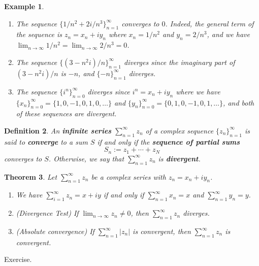 \documentclass[10pt]{article}
\makeatletter
\theoremstyle{newstyle}
\newtheorem{thm}{Theorem}[section]
\newtheorem{defn}[thm]{Definition}
\newtheorem{exmp}[thm]{Example}
\newenvironment{pf}[1][\proofname]{\par
  \pushQED{\qed}%
  \normalfont \topsep0\p@\relax
  \trivlist
  \item[\hskip\labelsep\scshape
  #1\@addpunct{.}]\ignorespaces
}{%
  \popQED\endtrivlist\@endpefalse
}
\makeatother
\begin{document}
\begin{exmp}~
\begin{enumerate}[(1)]
    \item The sequence $\{1/n^2 + 2i/n^3\}_{n=1}^\infty$ converges to $0$. Indeed, the general 
    term of the sequence is $z_n = x_n + iy_n$ where $x_n = 1/n^2$ and $y_n = 2/n^3$, and we have 
    $\lim_{n\to\infty} 1/n^2 = \lim_{n\to\infty} 2/n^3 = 0$. 
    \item The sequence $\{(3-n^2i)/n\}_{n=1}^\infty$ diverges since the imaginary part of 
    $(3-n^2i)/n$ is $-n$, and $\{-n\}_{n=1}^\infty$ diverges. 
    \item The sequence $\{i^n\}_{n=0}^\infty$ diverges since $i^n = x_n + iy_n$ where we have 
    $\{x_n\}_{n=0}^\infty = \{1, 0, -1, 0, 1, 0, \dots\}$ and 
    $\{y_n\}_{n=0}^\infty = \{0, 1, 0, -1, 0, 1, \dots\}$, and both of these sequences are divergent. 
\end{enumerate}
\end{exmp}

\begin{defn}
An {\bf infinite series} $\sum_{n=1}^\infty z_n$ of a complex sequence $\{z_n\}_{n=1}^\infty$ 
is said to {\bf converge} to a sum $S$ if and only if the {\bf sequence of partial sums} 
\[ S_n := z_1 + \cdots + z_N \] 
converges to $S$. Otherwise, we say that $\sum_{n=1}^\infty z_n$ is {\bf divergent}. 
\end{defn}

\begin{thm}
Let $\sum_{n=1}^\infty z_n$ be a complex series with $z_n = x_n + iy_n$. 
\begin{enumerate}[(1)]
    \item We have $\sum_{i=1}^\infty z_n = x + iy$ if and only if $\sum_{n=1}^\infty x_n = x$ and 
    $\sum_{n=1}^\infty y_n = y$. 
    \item (Divergence Test) If $\lim_{n\to\infty} z_n \neq 0$, then $\sum_{n=1}^\infty z_n$ diverges. 
    \item (Absolute convergence) If $\sum_{n=1}^\infty |z_n|$ is convergent, then 
    $\sum_{n=1}^\infty z_n$ is convergent. 
\end{enumerate}
\end{thm}
\begin{pf}
Exercise. 
\end{pf}
\end{document}
